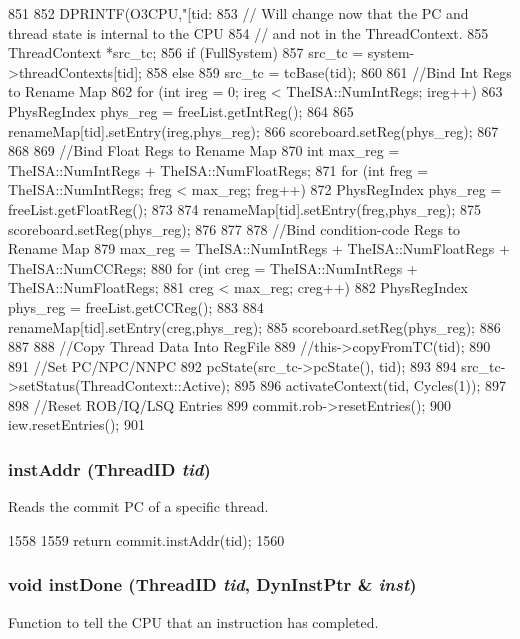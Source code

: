 \begin{DoxyCode}
851 {
852     DPRINTF(O3CPU,"[tid:%
853     // Will change now that the PC and thread state is internal to the CPU
854     // and not in the ThreadContext.
855     ThreadContext *src_tc;
856     if (FullSystem)
857         src_tc = system->threadContexts[tid];
858     else
859         src_tc = tcBase(tid);
860 
861     //Bind Int Regs to Rename Map
862     for (int ireg = 0; ireg < TheISA::NumIntRegs; ireg++) {
863         PhysRegIndex phys_reg = freeList.getIntReg();
864 
865         renameMap[tid].setEntry(ireg,phys_reg);
866         scoreboard.setReg(phys_reg);
867     }
868 
869     //Bind Float Regs to Rename Map
870     int max_reg = TheISA::NumIntRegs + TheISA::NumFloatRegs;
871     for (int freg = TheISA::NumIntRegs; freg < max_reg; freg++) {
872         PhysRegIndex phys_reg = freeList.getFloatReg();
873 
874         renameMap[tid].setEntry(freg,phys_reg);
875         scoreboard.setReg(phys_reg);
876     }
877 
878     //Bind condition-code Regs to Rename Map
879     max_reg = TheISA::NumIntRegs + TheISA::NumFloatRegs + TheISA::NumCCRegs;
880     for (int creg = TheISA::NumIntRegs + TheISA::NumFloatRegs;
881          creg < max_reg; creg++) {
882         PhysRegIndex phys_reg = freeList.getCCReg();
883 
884         renameMap[tid].setEntry(creg,phys_reg);
885         scoreboard.setReg(phys_reg);
886     }
887 
888     //Copy Thread Data Into RegFile
889     //this->copyFromTC(tid);
890 
891     //Set PC/NPC/NNPC
892     pcState(src_tc->pcState(), tid);
893 
894     src_tc->setStatus(ThreadContext::Active);
895 
896     activateContext(tid, Cycles(1));
897 
898     //Reset ROB/IQ/LSQ Entries
899     commit.rob->resetEntries();
900     iew.resetEntries();
901 }
\end{DoxyCode}
\hypertarget{classFullO3CPU_afae6152cf4b3a51162d6e64247c1ac09}{
\subsubsection[{instAddr}]{ instAddr ({\bf ThreadID} {\em tid})}}
\label{classFullO3CPU_afae6152cf4b3a51162d6e64247c1ac09}
Reads the commit PC of a specific thread. 


\begin{DoxyCode}
1558 {
1559     return commit.instAddr(tid);
1560 }
\end{DoxyCode}
\hypertarget{classFullO3CPU_a4edfd60ed9beaf439e83cfda0ba130e7}{
\subsubsection[{instDone}]{\setlength{\rightskip}{0pt plus 5cm}void instDone ({\bf ThreadID} {\em tid}, \/  {\bf DynInstPtr} \& {\em inst})}}
\label{classFullO3CPU_a4edfd60ed9beaf439e83cfda0ba130e7}
Function to tell the CPU that an instruction has completed. 


